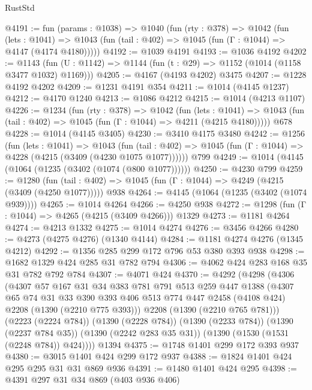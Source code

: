 \begin{lexlean}{RustStd}
\begin{coremodule}
@4191 := fun (params : @1038) =>
  @1040
    (fun (rty : @378) =>
    @1042
      (fun (lets : @1041) =>
      @1043 (fun (tail : @402) => @1045 (fun (Γ : @1044) => @4147 (@4174 @4180)))))
@4192 := @1039 @4191
@4193 := @1036 @4192
@4202 := @1143 (fun (U : @1142) => @1144 (fun (t : @29) => @1152 (@1014 (@1158 @3477 @1032) @1169)))
@4205 := @4167 (@4193 @4202) @3475
@4207 := @1228 @4192 @4202
@4209 := @1231 @4191 @354
@4211 := @1014 (@4145 @1237)
@4212 := @4170 @1240
@4213 := @1086 @4212
@4215 := @1014 (@4213 @1107)
@4226 := @1234
    (fun (rty : @378) =>
    @1042
      (fun (lets : @1041) =>
      @1043 (fun (tail : @402) => @1045 (fun (Γ : @1044) => @4211 (@4215 @4180)))))
    @678
@4228 := @1014 (@4145 @3405)
@4230 := @3410 @4175 @3480
@4242 := @1256
    (fun (lets : @1041) =>
    @1043
      (fun (tail : @402) => @1045 (fun (Γ : @1044) => @4228 (@4215 (@3409 (@4230 @1075 @1077))))))
    @799
@4249 := @1014 (@4145 (@1064 (@1235 (@3402 (@1074 (@800 @1077))))))
@4250 := @4230 @799
@4259 := @1280
    (fun (tail : @402) => @1045 (fun (Γ : @1044) => @4249 (@4215 (@3409 (@4250 @1077)))))
    @938
@4264 := @4145 (@1064 (@1235 (@3402 (@1074 @939))))
@4265 := @1014 @4264
@4266 := @4250 @938
@4272 := @1298 (fun (Γ : @1044) => @4265 (@4215 (@3409 @4266))) @1329
@4273 := @1181 @4264
@4274 := @4213 @1332
@4275 := @1014 @4274
@4276 := @3456 @4266
@4280 := @4273 (@4275 @4276) (@1340 @4144)
@4284 := @1181 @4274 @4276 (@1345 @4212)
@4292 := @1356 @285 @299 @172 @796 @53 @380 @393 @938
@4298 := @1682 @1329 @424 @285 @31 @782 @794
@4306 := @4062 @424 @283 @168 @35 @31 @782 @792 @784
@4307 := @4071 @424
@4370 := @4292
    (@4298
      (@4306
        (@4307
          @57
          @167
          @31
          @34
          @383
          @781
          @791
          @513
          @259
          @447
          @1388
          (@4307
            @65
            @74
            @31
            @33
            @390
            @393
            @406
            @513
            @774
            @447
            @2458
            (@4108 @424)
            @2208
            (@1390 (@2210 @775 @393)))
          @2208
          (@1390 (@2210 @765 @781)))
        (@2223 (@2224 @784))
        (@1390 (@2228 @784))
        (@1390 (@2233 @784))
        (@1390 (@2237 @784 @35))
        (@1390 (@2242 @283 @35 @31))
        (@1390 (@1530 (@1531 (@2248 @784)) @424))))
    @1394
@4375 := @1748 @1401 @299 @172 @393 @937
@4380 := @3015 @1401 @424 @299 @172 @937
@4388 := @1824 @1401 @424 @295 @295 @31 @31 @869 @936
@4391 := @1480 @1401 @424 @295
@4398 := @4391 @297 @31 @34 @869 (@403 @936 @406)

\end{coremodule}
\end{lexlean}
